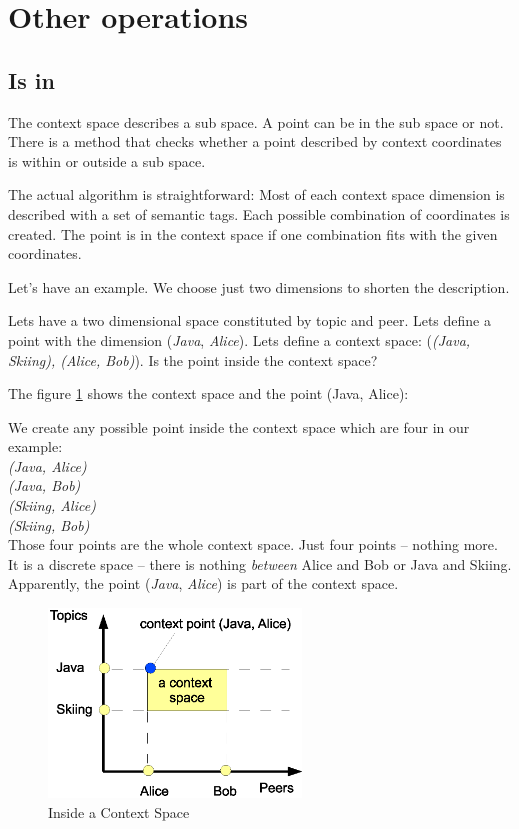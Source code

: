 \section{Other operations}

\subsection{Is in}
The context space describes a sub space. A point can be in the sub space or not.
There is a method that checks whether a point described by context coordinates is within or outside a sub space.

The actual algorithm is straightforward: Most of each context space dimension is described with a set of semantic tags. Each possible combination of coordinates is created. The point is in the context space if one combination fits with the given coordinates.

Let's have an example. We choose just two dimensions to shorten the description. 

Lets have a two dimensional space constituted by topic and peer. Lets define a point with the dimension ({\it Java}, {\it Alice}). Lets define a context space:
({\it (Java, Skiing), (Alice, Bob)}). Is the point inside the context space?

The figure \ref{fig:csIsIn} shows the context space and the point (Java, Alice):

We create any possible point inside the context space which are four in our example:\\
{\it (Java, Alice)}\\
{\it (Java, Bob)}\\
{\it (Skiing, Alice)}\\
{\it (Skiing, Bob)}\\

Those four points are the whole context space. Just four points -- nothing more. It is a discrete space -- there is nothing {\it between} Alice and Bob or Java and Skiing. Apparently, the point ({\it Java}, {\it Alice}) is part of the context space.

\begin{figure}[t]
\centering
\includegraphics[width=0.60\textwidth]{insideAContextSpace.eps}
\caption{Inside a Context Space}
\label{fig:csIsIn}
\end{figure}

